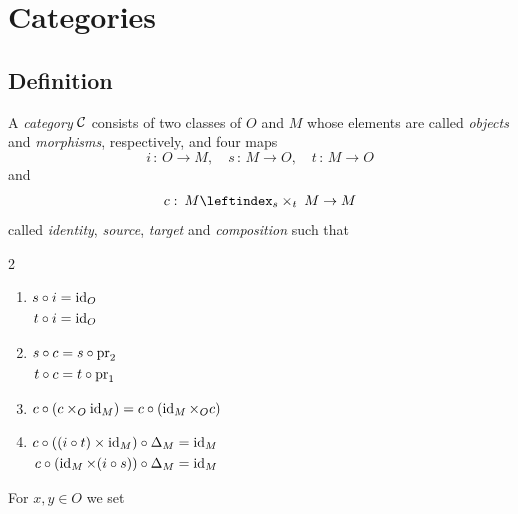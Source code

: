 \chapter{Categories}
    \section{Definition}
        A \emph{category} $\mathcal{C}$ consists of two classes of $O$ and $M$ whose elements are called \emph{objects} and \emph{morphisms}, respectively, and four maps
        \begin{equation*}
            i \,\colon\, O \to M, \quad s \,\colon\, M \to O, \quad t \,\colon\, M \to O
        \end{equation*}
        and
        \begin{equation*}
            c \,\colon\, M \leftindex_{s}\times_{t} \; M \to M
        \end{equation*}
        called \emph{identity}, \emph{source}, \emph{target} and \emph{composition}
        such that
        \begin{multicols}{2}
            \begin{enumerate}[label=\arabic*)]
                \item 
                    $\begin{aligned}[t]
                        s \circ i = \operatorname{id}_O \\
	                    t \circ i = \operatorname{id}_O
                    \end{aligned}$
                \item
                    $\begin{aligned}[t]
                        s \circ c &= s \circ \operatorname{pr}_2 \\
	                    t \circ c &= t \circ \operatorname{pr}_1
                    \end{aligned}$
                \item $c \circ (c \times_O \operatorname{id}_M) = c \circ (\operatorname{id}_M \times_O c)$
                \item
                    $\begin{aligned}[t]
                        c \circ ((i \circ t) \times \operatorname{id}_M) \circ \Delta_M &= \operatorname{id}_M \\
	                    c \circ (\operatorname{id}_M \times (i \circ s)) \circ \Delta_M &= \operatorname{id}_M
                    \end{aligned}$
            \end{enumerate}
        \end{multicols}
        For $x, y \in O$ we set
